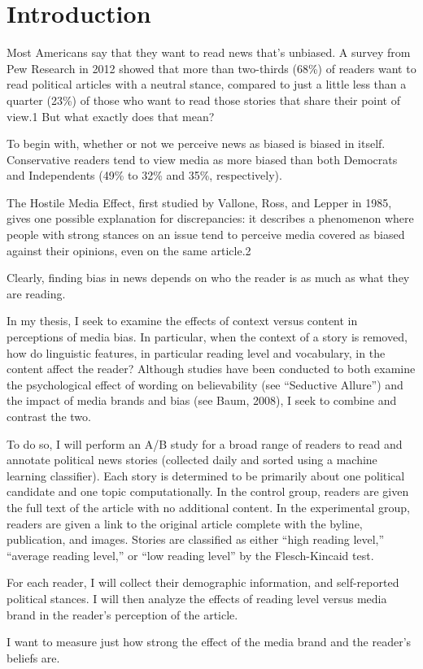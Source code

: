 \chapter{Introduction}
Most Americans say that they want to read news that's unbiased. A survey from Pew Research in 2012 showed that more than two-thirds (68\%) of readers want to read political articles with a neutral stance, compared to just a little less than a quarter (23\%) of those who want to read those stories that share their point of view.1 But what exactly does that mean?

To begin with, whether or not we perceive news as biased is biased in itself. Conservative readers tend to view media as more biased than both Democrats and Independents (49\% to 32\% and 35\%, respectively)\cite{Pew-bias-2012}.  

The Hostile Media Effect, first studied by Vallone, Ross, and Lepper in 1985, gives one possible explanation for discrepancies: it describes a phenomenon where people with strong stances on an issue tend to perceive media covered as biased against their opinions, even on the same article.2

Clearly, finding bias in news depends on who the reader is as much as what they are reading. 

In my thesis, I seek to examine the effects of context versus content in perceptions of media bias. In particular, when the context of a story is removed, how do linguistic features, in particular reading level and vocabulary, in the content affect the reader? Although studies have been conducted to both examine the psychological effect of wording on believability (see ``Seductive Allure'') and the impact of media brands and bias (see Baum, 2008), I seek to combine and contrast the two.

To do so, I will perform an A/B study for a broad range of readers to read and annotate political news stories (collected daily and sorted using a machine learning classifier). Each story is determined to be primarily about one political candidate and one topic computationally. In the control group, readers are given the full text of the article with no additional content. In the experimental group, readers are given a link to the original article complete with the byline, publication, and images. Stories are classified as either ``high reading level,'' ``average reading level,'' or ``low reading level'' by the Flesch-Kincaid test.

For each reader, I will collect their  demographic information, and self-reported political stances. I will then analyze the effects of reading level versus media brand in the reader's perception of the article. 

I want to measure just how strong the effect of the media brand and the reader's beliefs are.
